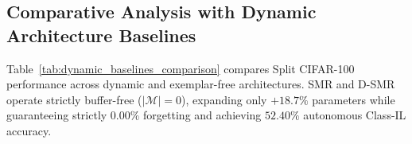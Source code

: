 \documentclass{article}
\begin{document}
\begin{table}[ht]
\centering
\caption{\textbf{Physical Hardware Measurements on NVIDIA GeForce RTX Silicon During Representation Learning (Batch Size 64, ResNet-18 Gradient Step)}.}
\label{tab:hardware_measurements}
\vskip 0.02in
\end{table}

\begin{table}[ht]
\centering
\caption{\textbf{Dynamic Test-Time Normalization under CIFAR-10-C Environmental Corruptions}.}
\label{tab:tta_cifar10c}
\vskip 0.02in
\end{table}

\subsection{Comparative Analysis with Dynamic Architecture Baselines}
\label{sec:app_dynamic_baselines}
Table~\ref{tab:dynamic_baselines_comparison} compares Split CIFAR-100 performance across dynamic and exemplar-free architectures. SMR and D-SMR operate strictly buffer-free ($|\mathcal{M}|=0$), expanding only $+18.7\%$ parameters while guaranteeing strictly $0.00\%$ forgetting and achieving $52.40\%$ autonomous Class-IL accuracy.
\end{document}
